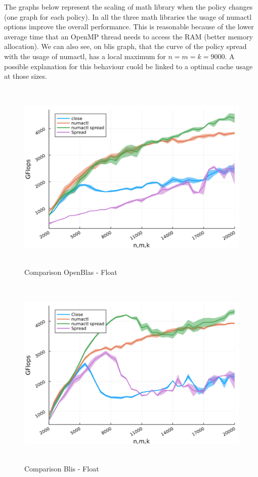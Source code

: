 \documentclass[
  letterpaper,
  DIV=11,
  numbers=noendperiod]{scrartcl}
\begin{document}
\newpage

The graphs below represent the scaling of math library when the policy
changes (one graph for each policy). In all the three math libraries the
usage of numactl options improve the overall performance. This is
reasonable because of the lower average time that an OpenMP thread needs
to access the RAM (better memory allocation). We can also see, on blis
graph, that the curve of the policy spread with the usage of numactl,
has a local maximum for \(n=m=k=9000\). A possible explanation for this
behaviour cuold be linked to a optimal cache usage at those sizes.

\begin{figure}

{\centering \includegraphics[width=\textwidth,height=3.64583in]{img/float_obals_comparison.png}

}

\caption{Comparison OpenBlas - Float}

\end{figure}

\begin{figure}

{\centering \includegraphics[width=\textwidth,height=3.64583in]{img/float_blis_comparison.png}

}

\caption{Comparison Blis - Float}

\end{figure}
\end{document}
